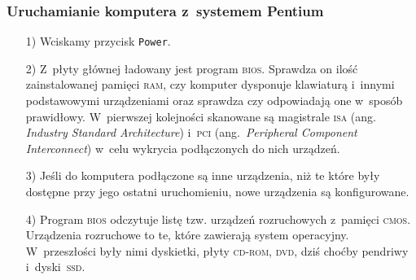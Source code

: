 \documentclass[10pt,t]{beamer}
\begin{document}
\begin{frame}
  \frametitle{Uruchamianie komputera z~systemem Pentium}


  \begin{itemize}

  \item[1)] Wciskamy przycisk \texttt{Power}.

  \item[2)] Z~płyty głównej ładowany jest program \textsc{bios}. Sprawdza on
    ilość zainstalowanej pamięci \textsc{ram}, czy komputer dysponuje
    klawiaturą i~innymi podstawowymi urządzeniami oraz sprawdza czy
    odpowiadają one w~sposób prawidłowy. W~pierwszej kolejności skanowane
    są magistrale \textsc{isa} (ang. \textit{Industry Standard
      Architecture}) i~\textsc{pci} (ang.~\textit{Peripheral Component
      Interconnect}) w~celu wykrycia podłączonych do nich urządzeń.

  \item[3)] Jeśli do komputera podłączone są inne urządzenia, niż te które
    były dostępne przy jego ostatni uruchomieniu, nowe urządzenia są
    konfigurowane.

  \item[4)] Program \textsc{bios} odczytuje listę tzw. urządzeń rozruchowych
    z~pamięci \textsc{cmos}. Urządzenia rozruchowe to te, które zawierają
    system operacyjny. W~przeszłości były nimi dyskietki, płyty
    \textsc{cd}-\textsc{rom}, \textsc{dvd}, dziś choćby pendriwy
    i~dyski~\textsc{ssd}.

  \end{itemize}

\end{frame}
\end{document}
